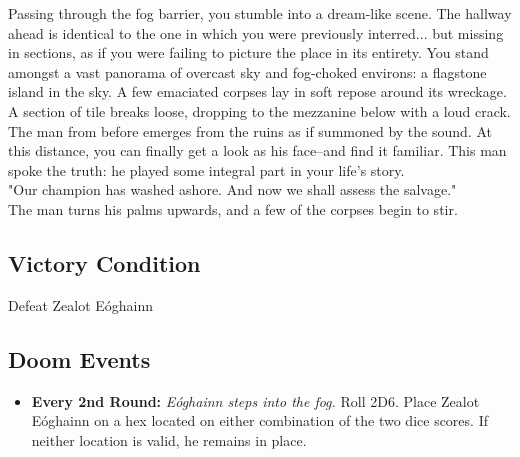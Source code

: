 Passing through the fog barrier, you stumble into a dream-like scene. The hallway ahead is identical to the one in which you were previously interred... but missing in sections, as if you were failing to picture the place in its entirety. You stand amongst a vast panorama of overcast sky and fog-choked environs: a flagstone island in the sky. A few emaciated corpses lay in soft repose around its wreckage.\\

A section of tile breaks loose, dropping to the mezzanine below with a loud crack.\\

The man from before emerges from the ruins as if summoned by the sound. At this distance, you can finally get a look as his face--and find it familiar. This man spoke the truth: he played some integral part in your life's story.\\

"Our champion has washed ashore. And now we shall assess the salvage."\\

The man turns his palms upwards, and a few of the corpses begin to stir.\\

\subsection*{Victory Condition}
Defeat Zealot Eóghainn

\subsection*{Doom Events}
\begin{itemize}
\item \textbf{Every 2nd Round:} \emph{Eóghainn steps into the fog.} Roll 2D6. Place Zealot Eóghainn on a hex located on either combination of the two dice scores. If neither location is valid, he remains in place.
\end{itemize}

\pagebreak

